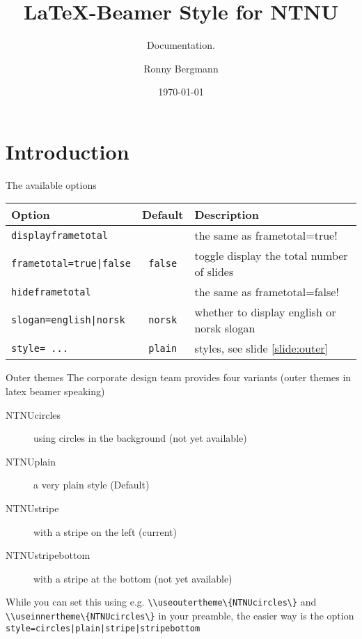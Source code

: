 \documentclass[aspectratio=169]{beamer}
\title{\LaTeX{}-Beamer Style for NTNU}
\subtitle{Documentation.}
\author{Ronny Bergmann}
\date{\today}
\begin{document}
	\maketitle
	\tableofcontents

	\section{Introduction}
	\begin{frame}[fragile]{The available options}
		\begin{tabular}{lcl}
			\toprule
			\textbf{Option} & \textbf{Default} &\textbf{Description} \\
			\midrule
			\lstinline!displayframetotal! && the same as \lstinline!!frametotal=true! \\
			\lstinline!frametotal=true|false! & \lstinline!false! & toggle display the total number of slides\\
			\lstinline!hideframetotal! && the same as \lstinline!!frametotal=false! \\
			\lstinline!slogan=english|norsk! & \lstinline!norsk! & whether to display english or norsk slogan\\
			\lstinline!style= ...! & \lstinline!plain! & styles, see slide \ref{slide:outer}\\
			\bottomrule
		\end{tabular}
	\end{frame}
	\begin{frame}{Outer themes}
		\label{slide:outer}
		The corporate design team provides four variants (outer themes in latex beamer speaking)

		\begin{description}
			\item[NTNUcircles] using circles in the background (not yet available)
			\item[NTNUplain] a very plain style (Default)
			\item[NTNUstripe] with a stripe on the left (current)
			\item[NTNUstripebottom] with a stripe at the bottom (not yet available)
		\end{description}

		While you can set this using e.g. \lstinline!\\useoutertheme\{NTNUcircles\}! and \lstinline!\\useinnertheme\{NTNUcircles\}!
		in your preamble, the easier way is the option
        \lstinline!style=circles|plain|stripe|stripebottom!
	\end{frame}
\end{document}
